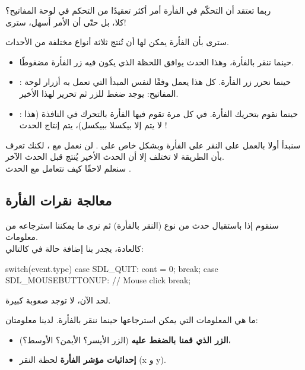 ربما تعتقد أن التحكّم في الفأرة أمر أكثر تعقيدًا من التحكم في لوحة المفاتيح؟\\
كلا، بل حتّى أن الأمر أسهل، سترى!

سترى بأن الفأرة يمكن لها أن تُنتج ثلاثة أنواع مختلفة من الأحداث.

\begin{itemize}
	\item {}
	حينما ننقر بالفأرة، وهذا الحدث يوافق اللحظة الذي يكون فيه زر الفأرة مضغوطًا.
	\item {}:
	حينما نحرر زر الفأرة. كل هذا يعمل وفقًا لنفس المبدأ التي تعمل به أزرار لوحة المفاتيح: يوجد ضغط للزر ثم تحرير لهذا الأخير.
	\item {}:
	حينما نقوم بتحريك الفأرة. في كل مرة تقوم فيها الفأرة بالتحرك في النافذة (هذا لا يتم إلا بيكسلا ببيكسل)، يتم إنتاج الحدث 
	!
\end{itemize}
 
سنبدأ أولا بالعمل على النقر على الفأرة وبشكل خاص على
.
لن نعمل مع
،
لكنك تعرف بأن الطريقة لا تختلف إلا أن الحدث الأخير يُنتج قبل الحدث الآخر.\\
سنعلم لاحقًا كيف نتعامل مع الحدث
.

\subsection{معالجة نقرات الفأرة}

سنقوم إذا باستقبال حدث من نوع
(النقر بالفأرة) ثم نرى ما يمكننا استرجاعه من معلومات.\\
كالعادة، يجدر بنا إضافة حالة
في 
كالتالي:

\begin{Csource}
switch(event.type)
{
	case SDL_QUIT:
	cont = 0;
	break;
	case SDL_MOUSEBUTTONUP: // Mouse click
	break;
} 
\end{Csource}

لحد الآن، لا توجد صعوبة كبيرة.

ما هي المعلومات التي يمكن استرجاعها حينما ننقر بالفأرة. لدينا معلومتان:

\begin{itemize}
	\item \textbf{الزر الذي قمنا بالضغط عليه}
	 (الزر الأيسر؟ الأيمن؟ الأوسط؟)،
	\item \textbf{إحداثيات مؤشر الفأرة}
	 لحظة النقر 
	(\textenglish{x}
	و
	\textenglish{y}).
\end{itemize}


